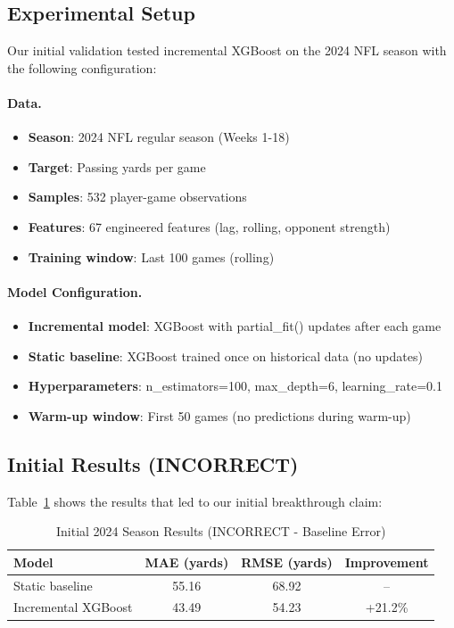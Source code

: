 \subsection{Experimental Setup}

Our initial validation tested incremental XGBoost on the 2024 NFL season with the following configuration:

\paragraph{Data.}
\begin{itemize}
\item \textbf{Season}: 2024 NFL regular season (Weeks 1-18)
\item \textbf{Target}: Passing yards per game
\item \textbf{Samples}: 532 player-game observations
\item \textbf{Features}: 67 engineered features (lag, rolling, opponent strength)
\item \textbf{Training window}: Last 100 games (rolling)
\end{itemize}

\paragraph{Model Configuration.}
\begin{itemize}
\item \textbf{Incremental model}: XGBoost with partial\_fit() updates after each game
\item \textbf{Static baseline}: XGBoost trained once on historical data (no updates)
\item \textbf{Hyperparameters}: n\_estimators=100, max\_depth=6, learning\_rate=0.1
\item \textbf{Warm-up window}: First 50 games (no predictions during warm-up)
\end{itemize}

\subsection{Initial Results (INCORRECT)}

Table~\ref{tab:initial-results-incorrect} shows the results that led to our initial breakthrough claim:

\begin{table}[htbp]
\centering
\caption{Initial 2024 Season Results (INCORRECT - Baseline Error)}
\label{tab:initial-results-incorrect}
\begin{tabular}{lccc}
\toprule
\textbf{Model} & \textbf{MAE (yards)} & \textbf{RMSE (yards)} & \textbf{Improvement} \\
\midrule
Static baseline & 55.16 & 68.92 & -- \\
Incremental XGBoost & 43.49 & 54.23 & +21.2\% \\
\bottomrule
\end{tabular}
\end{table}

